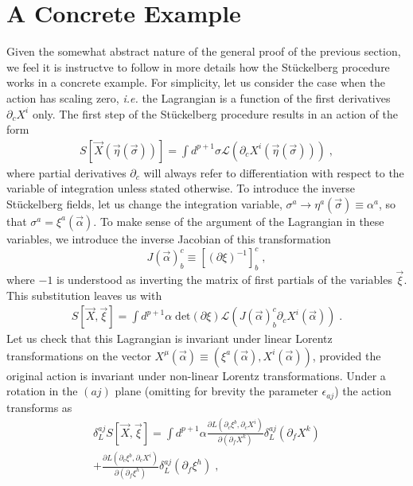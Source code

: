 \documentclass[%
 reprint,
 amsmath,amssymb,
 aps,
]{revtex4-1}
\begin{document}
\section{A Concrete Example}
Given the somewhat abstract nature of the general proof of the previous section, we feel it is instructve to follow in more details
 how the St\"uckelberg procedure works in a concrete example. For simplicity, let us consider the case when the action has scaling zero,
 {\it i.e.} the Lagrangian is a function of the first derivatives $\partial_c X^i$ only. The first step of the St\"uckelberg procedure
 results in an action of the form
\begin{eqnarray}
    S[\vec{X}(\vec{\eta}(\vec{\sigma}))] = \int d^{p+1} \sigma \mathcal{L}
     (\partial_c X^i (\vec{\eta}(\vec{\sigma}))) \; , \nonumber
\end{eqnarray}
where partial derivatives $\partial_c$ will always refer to differentiation with respect to the variable of integration
unless stated otherwise.  To introduce the inverse St\"uckelberg fields, let us change the integration variable,
 $\sigma^a \rightarrow \eta^a(\vec{\sigma}) \equiv \alpha^a$, so that
$\sigma^a = \xi^a(\vec{\alpha})$. To make sense of the argument of the Lagrangian in these variables, we introduce the inverse
Jacobian of this transformation
\begin{equation}
    J(\vec{\alpha})^c_b \equiv [(\partial \xi)^{-1}]^c_b \; ,
\end{equation}
where $-1$ is understood as inverting the matrix of first partials of the variables $\vec{\xi}$.
This substitution leaves us with
\begin{eqnarray}
    S[\vec{X},\vec{\xi}]  = \int d^{p+1} \alpha\;
   \mathrm{det}\left({\partial \xi} \right)
   \mathcal{L}( J(\vec{\alpha})^c_b \partial_c X^i(\vec{\alpha}) )
     \; . \nonumber
\end{eqnarray}
Let us check that this Lagrangian is invariant under linear Lorentz
transformations on the vector $X^{\mu}(\vec{\alpha}) \equiv (\xi^a(\vec{\alpha}), X^i(\vec{\alpha}))$,
provided the original  action is invariant under non-linear Lorentz transformations. Under  a rotation
in the $(aj)$ plane (omitting for brevity the parameter $\epsilon_{a j}$) the action transforms as
\begin{gather}
\label{Lvariation}
    \delta^{a j}_{L}S[\vec{X},\vec{\xi}] =
    \int d^{p+1} \alpha \frac{\partial L(\partial_c \xi^b, \partial_c X^i)}{\partial(\partial_f X^k)}
    \delta^{a j}_{L} (\partial_f X^k)  \\
    + \frac{\partial L(\partial_c \xi^b, \partial_c X^i)}{\partial(\partial_f \xi^h)}
    \delta^{a j}_{L} (\partial_f \xi^h) \nonumber\;,
\end{gather}
\end{document}
